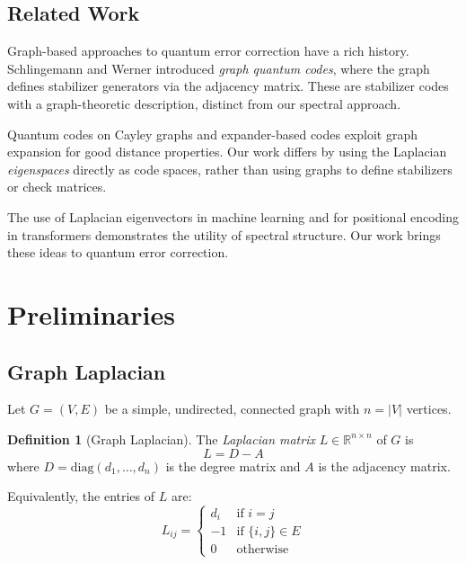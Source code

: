 \documentclass[11pt,a4paper]{article}
\theoremstyle{definition}
\newtheorem{definition}[theorem]{Definition}
\newcommand{\R}{\mathbb{R}}
\newcommand{\diag}{\mathrm{diag}}
\begin{document}
\subsection{Related Work}

Graph-based approaches to quantum error correction have a rich history. Schlingemann and Werner \cite{schlingemann2001quantum} introduced \emph{graph quantum codes}, where the graph defines stabilizer generators via the adjacency matrix. These are stabilizer codes with a graph-theoretic description, distinct from our spectral approach.

Quantum codes on Cayley graphs \cite{tillich2014quantum} and expander-based codes \cite{sipser1996expander} exploit graph expansion for good distance properties. Our work differs by using the Laplacian \emph{eigenspaces} directly as code spaces, rather than using graphs to define stabilizers or check matrices.

The use of Laplacian eigenvectors in machine learning \cite{belkin2003laplacian} and for positional encoding in transformers \cite{dwivedi2020generalization} demonstrates the utility of spectral structure. Our work brings these ideas to quantum error correction.

\section{Preliminaries}
\label{sec:preliminaries}

\subsection{Graph Laplacian}

Let $G = (V, E)$ be a simple, undirected, connected graph with $n = |V|$ vertices.

\begin{definition}[Graph Laplacian]
The \emph{Laplacian matrix} $L \in \R^{n \times n}$ of $G$ is
\begin{equation}
    L = D - A
\end{equation}
where $D = \diag(d_1, \ldots, d_n)$ is the degree matrix and $A$ is the adjacency matrix.
\end{definition}

Equivalently, the entries of $L$ are:
\begin{equation}
    L_{ij} = \begin{cases}
        d_i & \text{if } i = j \\
        -1 & \text{if } \{i,j\} \in E \\
        0 & \text{otherwise}
    \end{cases}
\end{equation}
\end{document}
